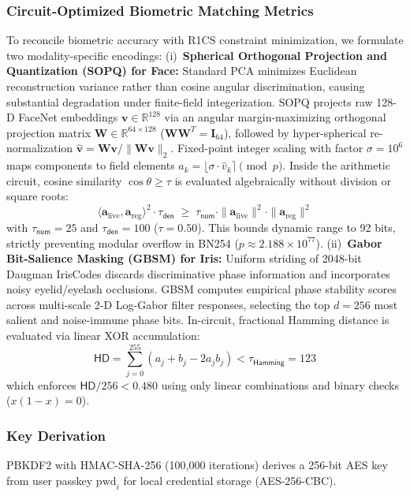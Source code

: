 \documentclass[10pt,letterpaper,journal]{IEEEtran}
\begin{document}
\subsubsection{Circuit-Optimized Biometric Matching Metrics}
\label{sec:metric_formulation}
To reconcile biometric accuracy with R1CS constraint minimization, we formulate two modality-specific encodings:
(i)~\textbf{Spherical Orthogonal Projection and Quantization (SOPQ) for Face:} Standard PCA minimizes Euclidean reconstruction variance rather than cosine angular discrimination, causing substantial degradation under finite-field integerization. SOPQ projects raw 128-D FaceNet embeddings $\mathbf{v} \in \mathbb{R}^{128}$ via an angular margin-maximizing orthogonal projection matrix $\mathbf{W} \in \mathbb{R}^{64 \times 128}$ ($\mathbf{W}\mathbf{W}^T = \mathbf{I}_{64}$), followed by hyper-spherical re-normalization $\hat{\mathbf{v}} = \mathbf{W}\mathbf{v} / \|\mathbf{W}\mathbf{v}\|_2$. Fixed-point integer scaling with factor $\sigma = 10^6$ maps components to field elements $a_k = \lfloor \sigma \cdot \hat{v}_k \rceil \pmod{p}$. Inside the arithmetic circuit, cosine similarity $\cos\theta \ge \tau$ is evaluated algebraically without division or square roots:
\begin{equation}
\label{eq:sopq-circuit}
\langle \mathbf{a}_{\text{live}}, \mathbf{a}_{\text{reg}} \rangle^2 \cdot \tau_{\mathsf{den}} \;\ge\; \tau_{\mathsf{num}} \cdot \|\mathbf{a}_{\text{live}}\|^2 \cdot \|\mathbf{a}_{\text{reg}}\|^2
\end{equation}
with $\tau_{\mathsf{num}} = 25$ and $\tau_{\mathsf{den}} = 100$ ($\tau = 0.50$). This bounds dynamic range to 92 bits, strictly preventing modular overflow in BN254 ($p \approx 2.188 \times 10^{77}$).
(ii)~\textbf{Gabor Bit-Salience Masking (GBSM) for Iris:} Uniform striding of 2048-bit Daugman IrisCodes discards discriminative phase information and incorporates noisy eyelid/eyelash occlusions. GBSM computes empirical phase stability scores across multi-scale 2-D Log-Gabor filter responses, selecting the top $d = 256$ most salient and noise-immune phase bits. In-circuit, fractional Hamming distance is evaluated via linear XOR accumulation:
\begin{equation}
\label{eq:gbsm-circuit}
\mathsf{HD} = \sum_{j=0}^{255}(a_j + b_j - 2a_j b_j) < \tau_{\mathsf{Hamming}} = 123
\end{equation}
which enforces $\mathsf{HD}/256 < 0.480$ using only linear combinations and binary checks ($x(1-x)=0$).

\subsubsection{Key Derivation}
PBKDF2 with HMAC-SHA-256 (100,000 iterations) derives a 256-bit AES key from user passkey $\text{pwd}_i$ for local credential storage (AES-256-CBC).
\end{document}

